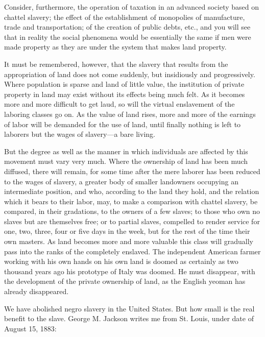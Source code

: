 \documentclass{book}
\begin{document}
Consider, furthermore, the operation of taxation in an advanced society based on chattel slavery; the effect of the establishment of monopolies of manufacture, trade and transportation; of the creation of public debts, etc., and you will see that in reality the social phenomena would be essentially the same if men were made property as they are under the system that makes land property.

It must be remembered, however, that the slavery that results from the appropriation of land does not come suddenly, but insidiously and progressively. Where population is sparse and land of little value, the institution of private property in land may exist without its effects being much felt. As it becomes more and more difficult to get laud, so will the virtual enslavement of the laboring classes go on. As the value of land rises, more and more of the earnings of labor will be demanded for the use of land, until finally nothing is left to laborers but the wages of slavery—a bare living.

But the degree as well as the manner in which individuals are affected by this movement must vary very much. Where the ownership of land has been much diffused, there will remain, for some time after the mere laborer has been reduced to the wages of slavery, a greater body of smaller landowners occupying an intermediate position, and who, according to the land they hold, and the relation which it bears to their labor, may, to make a comparison with chattel slavery, be compared, in their gradations, to the owners of a few slaves; to those who own no slaves but are themselves free; or to partial slaves, compelled to render service for one, two, three, four or five days in the week, but for the rest of the time their own masters. As land becomes more and more valuable this class will gradually pass into the ranks of the completely enslaved. The independent American farmer working with his own hands on his own land is doomed as certainly as two thousand years ago his prototype of Italy was doomed. He must disappear, with the development of the private ownership of land, as the English yeoman has already disappeared.

We have abolished negro slavery in the United States. But how small is the real benefit to the slave. George M. Jackson writes me from St. Louis, under date of August 15, 1883:
\end{document}
